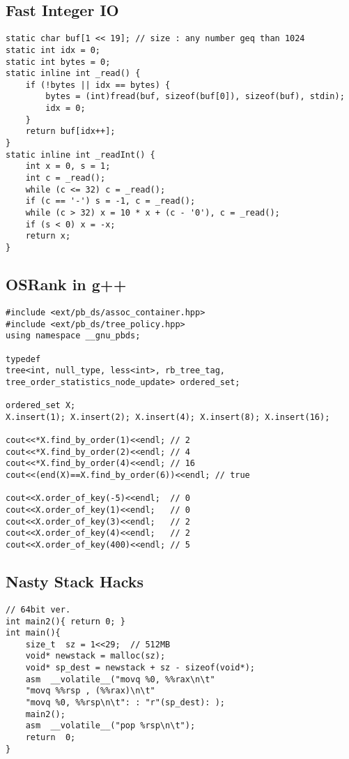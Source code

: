 \documentclass[landscape, 8pt, a4paper, oneside, twocolumn]{extarticle}
\begin{document}
\subsection {Fast Integer IO}
\begin{verbatim}
static char buf[1 << 19]; // size : any number geq than 1024
static int idx = 0;
static int bytes = 0;
static inline int _read() {
	if (!bytes || idx == bytes) {
		bytes = (int)fread(buf, sizeof(buf[0]), sizeof(buf), stdin);
		idx = 0;
	}
	return buf[idx++];
}
static inline int _readInt() {
	int x = 0, s = 1;
	int c = _read();
	while (c <= 32) c = _read();
	if (c == '-') s = -1, c = _read();
	while (c > 32) x = 10 * x + (c - '0'), c = _read();
	if (s < 0) x = -x;
	return x;
}
\end{verbatim}
\subsection {OSRank in g++}
\begin{verbatim}
#include <ext/pb_ds/assoc_container.hpp>
#include <ext/pb_ds/tree_policy.hpp>
using namespace __gnu_pbds;

typedef
tree<int, null_type, less<int>, rb_tree_tag, tree_order_statistics_node_update> ordered_set;

ordered_set X;
X.insert(1); X.insert(2); X.insert(4); X.insert(8); X.insert(16);

cout<<*X.find_by_order(1)<<endl; // 2
cout<<*X.find_by_order(2)<<endl; // 4
cout<<*X.find_by_order(4)<<endl; // 16
cout<<(end(X)==X.find_by_order(6))<<endl; // true

cout<<X.order_of_key(-5)<<endl;  // 0
cout<<X.order_of_key(1)<<endl;   // 0
cout<<X.order_of_key(3)<<endl;   // 2
cout<<X.order_of_key(4)<<endl;   // 2
cout<<X.order_of_key(400)<<endl; // 5
\end{verbatim}
\subsection {Nasty Stack Hacks}
\begin{verbatim}
// 64bit ver.
int main2(){ return 0; }
int main(){
	size_t  sz = 1<<29;  // 512MB
	void* newstack = malloc(sz);
	void* sp_dest = newstack + sz - sizeof(void*);
	asm  __volatile__("movq %0, %%rax\n\t"
	"movq %%rsp , (%%rax)\n\t"
	"movq %0, %%rsp\n\t": : "r"(sp_dest): );
	main2();
	asm  __volatile__("pop %rsp\n\t");
	return  0;
}
\end{verbatim}
\end{document}
